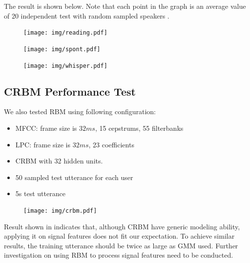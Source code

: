 The result is shown below. Note that each point in the graph is an
average value of 20 independent test with random sampled speakers .

\begin{figure}[H]
  \centering
  \texttt{[image: img/reading.pdf]}
\end{figure}
\begin{figure}[H]
  \centering
  \texttt{[image: img/spont.pdf]}
\end{figure}

\begin{figure}[H]
  \centering
  \texttt{[image: img/whisper.pdf]}
\end{figure}

\subsection{CRBM Performance Test}
We also tested RBM using following configuration:
\begin{itemize}
  \item MFCC: frame size is $32 ms $, 15 cepstrums, 55 filterbanks
  \item LPC: frame size is $32 ms $, 23 coefficients
  \item CRBM with 32 hidden units.
  \item 50 sampled test utterance for each user
  \item 5s test utterance
\end{itemize}

\begin{figure}[H]
  \centering
  \texttt{[image: img/crbm.pdf]}
  \caption{\label{crbmresult}}
\end{figure}

Result shown in  indicates that, although CRBM have
generic modeling ability, applying it on signal features does not fit
our expectation. To achieve similar results, the training utterance should
be twice as large as GMM used. Further investigation on using RBM to
process signal features need to be conducted.


